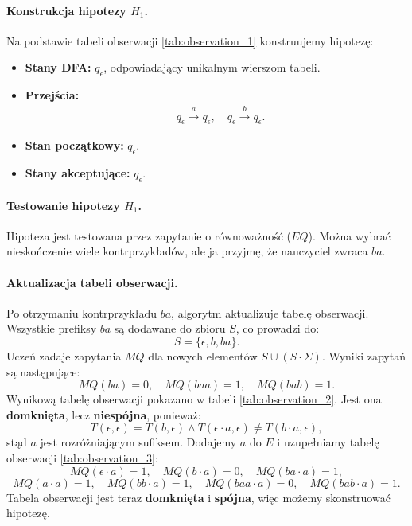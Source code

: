 \paragraph*{Konstrukcja hipotezy $H_1$.}
Na podstawie tabeli obserwacji \ref{tab:observation_1} konstruujemy hipotezę:
\begin{itemize}
    \item \textbf{Stany DFA:} \( q_\epsilon \), odpowiadający unikalnym wierszom tabeli.
    \item \textbf{Przejścia:}
    \begin{align*}
        & q_\epsilon \xrightarrow{a} q_\epsilon, \quad q_\epsilon \xrightarrow{b} q_\epsilon.
    \end{align*}
    \item \textbf{Stan początkowy:} \( q_\epsilon \).
    \item \textbf{Stany akceptujące:} \( q_\epsilon \).
\end{itemize}

\paragraph*{Testowanie hipotezy $H_1$.}
Hipoteza jest testowana przez zapytanie o równoważność ($EQ$). Można wybrać nieskończenie wiele kontrprzykładów, ale ja przyjmę, że nauczyciel zwraca $ba$.

\paragraph*{Aktualizacja tabeli obserwacji.}
Po otrzymaniu kontrprzykładu \( ba \), algorytm aktualizuje tabelę obserwacji. Wszystkie prefiksy \( ba \) są dodawane do zbioru \( S \), co prowadzi do:
\[
S = \{\epsilon, b, ba\}.
\]
Uczeń zadaje zapytania \( MQ \) dla nowych elementów \( S \cup (S \cdot \Sigma) \). Wyniki zapytań są następujące:
\[
MQ(ba) = 0, \quad MQ(baa) = 1, \quad MQ(bab) = 1.
\]
Wynikową tabelę obserwacji pokazano w tabeli \ref{tab:observation_2}. Jest ona \textbf{domknięta}, lecz \textbf{niespójna}, ponieważ:
\[
T(\epsilon, \epsilon) = T(b, \epsilon) \wedge T(\epsilon \cdot a, \epsilon) \neq T(b \cdot a, \epsilon),
\]
stąd $a$ jest rozróżniającym sufiksem. Dodajemy $a$ do $E$ i uzupełniamy tabelę obserwacji \ref{tab:observation_3}:
\[
MQ(\epsilon \cdot a) = 1, \quad MQ(b \cdot a) = 0, \quad MQ(ba \cdot a) = 1,
\]
\[
MQ(a \cdot a) = 1, \quad MQ(bb \cdot a) = 1, \quad MQ(baa \cdot a) = 0, \quad MQ(bab \cdot a) = 1.
\]
Tabela obserwacji jest teraz \textbf{domknięta} i \textbf{spójna}, więc możemy skonstruować hipotezę.


